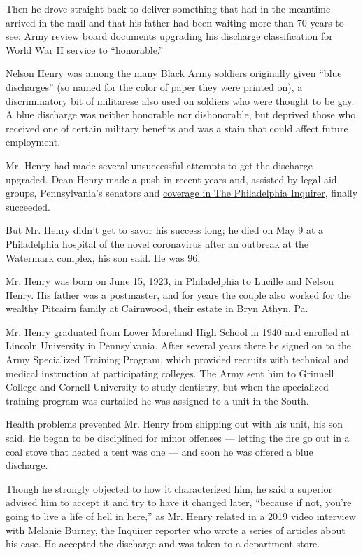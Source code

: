 Then he drove straight back to deliver something that had in the
meantime arrived in the mail and that his father had been waiting more
than 70 years to see: Army review board documents upgrading his
discharge classification for World War II service to ``honorable.''

Nelson Henry was among the many Black Army soldiers originally given
``blue discharges'' (so named for the color of paper they were printed
on), a discriminatory bit of militarese also used on soldiers who were
thought to be gay. A blue discharge was neither honorable nor
dishonorable, but deprived those who received one of certain military
benefits and was a stain that could affect future employment.

Mr. Henry had made several unsuccessful attempts to get the discharge
upgraded. Dean Henry made a push in recent years and, assisted by legal
aid groups, Pennsylvania's senators and
\href{https://www.inquirer.com/news/philadelphia/nelson-henry-veteran-army-blue-discharge-philadelphia-20190604.html}{coverage
in The Philadelphia Inquirer}, finally succeeded.

But Mr. Henry didn't get to savor his success long; he died on May 9 at
a Philadelphia hospital of the novel coronavirus after an outbreak at
the Watermark complex, his son said. He was 96.

Mr. Henry was born on June 15, 1923, in Philadelphia to Lucille and
Nelson Henry. His father was a postmaster, and for years the couple also
worked for the wealthy Pitcairn family at Cairnwood, their estate in
Bryn Athyn, Pa.

Mr. Henry graduated from Lower Moreland High School in 1940 and enrolled
at Lincoln University in Pennsylvania. After several years there he
signed on to the Army Specialized Training Program, which provided
recruits with technical and medical instruction at participating
colleges. The Army sent him to Grinnell College and Cornell University
to study dentistry, but when the specialized training program was
curtailed he was assigned to a unit in the South.

Health problems prevented Mr. Henry from shipping out with his unit, his
son said. He began to be disciplined for minor offenses --- letting the
fire go out in a coal stove that heated a tent was one --- and soon he
was offered a blue discharge.

Though he strongly objected to how it characterized him, he said a
superior advised him to accept it and try to have it changed later,
``because if not, you're going to live a life of hell in here,'' as Mr.
Henry related in a 2019 video interview with Melanie Burney, the
Inquirer reporter who wrote a series of articles about his case. He
accepted the discharge and was taken to a department store.

